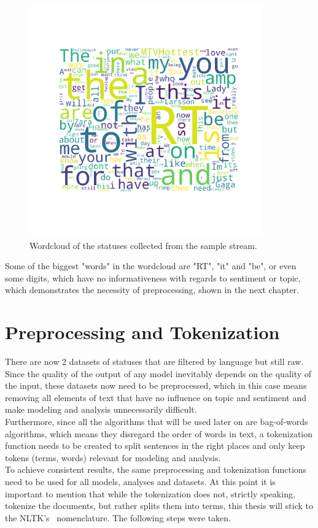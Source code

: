 \begin{figure}
    \centering
    \caption{Wordcloud of the statuses collected from the sample stream.}
    \label{fig:wordloud_pre}
    \includegraphics[width=10cm]{../images/wordcloud_pre.png}
\end{figure}

Some of the biggest "words" in the wordcloud are "RT", "it" and "be",
or even some digits, which have no informativeness with regards to sentiment or topic,
which demonstrates the necessity of preprocessing, shown in the next chapter.


\section{Preprocessing and Tokenization}
\label{sec:preprocessingAndTokenization}

There are now 2 datasets of statuses that are filtered by language but still raw.
Since the quality of the output of any model inevitably depends on the quality of the input,
these datasets now need to be preprocessed,
which in this case means removing all elements of text that have no influence on topic and sentiment and make
modeling and analysis unnecessarily difficult.\\
Furthermore, since all the algorithms that will be used later on are bag-of-words algorithms,
which means they disregard the order of words in text, a tokenization function needs to be created
to split sentences in the right places and only keep tokens (terms, words) relevant for modeling and analysis.\\
To achieve consistent results, the same preprocessing and tokenization functions need to be used for all models, analyses and datasets.
At this point it is important to mention that while the tokenization does not, strictly speaking, tokenize the documents,
but rather splits them into terms, this thesis will stick to the NLTK's~\cite{nltkDocs} nomenclature.
The following steps were taken.

